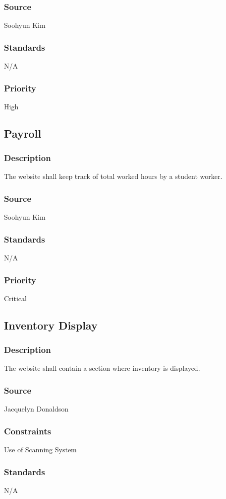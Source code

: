 \subsubsection{Source}
Soohyun Kim
\subsubsection{Standards}
N/A
\subsubsection{Priority}
High

\subsection{Payroll}
\subsubsection{Description}
The website shall keep track of total worked hours by a student worker.
\subsubsection{Source}
Soohyun Kim
\subsubsection{Standards}
N/A
\subsubsection{Priority}
Critical

\subsection{Inventory Display}
\subsubsection{Description}
The website shall contain a section where inventory is displayed.
\subsubsection{Source}
Jacquelyn Donaldson
\subsubsection{Constraints}
Use of Scanning System
\subsubsection{Standards}
N/A

